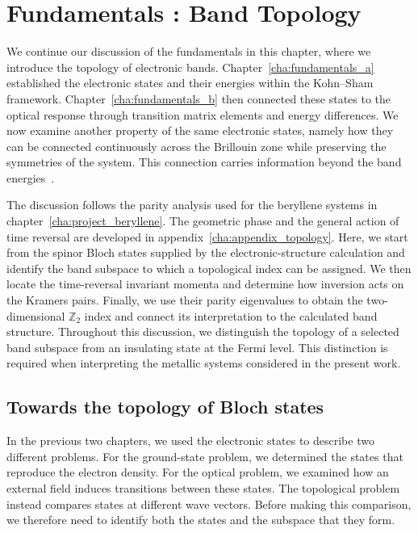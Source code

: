 \chapter{Fundamentals : Band Topology}
\label{cha:fundamentals_c}

We continue our discussion of the fundamentals in this chapter, where we introduce the topology of electronic bands.
Chapter~\ref{cha:fundamentals_a} established the electronic states and their energies within the Kohn--Sham framework.
Chapter~\ref{cha:fundamentals_b} then connected these states to the optical response through transition matrix elements and energy differences.
We now examine another property of the same electronic states, namely how they can be connected continuously across the Brillouin zone while preserving the symmetries of the system.
This connection carries information beyond the band energies~\cite{bansil2016colloquium}.

The discussion follows the parity analysis used for the beryllene systems in chapter~\ref{cha:project_beryllene}.
The geometric phase and the general action of time reversal are developed in appendix~\ref{cha:appendix_topology}.
Here, we start from the spinor Bloch states supplied by the electronic-structure calculation
and identify the band subspace to which a topological index can be assigned.
We then locate the time-reversal invariant momenta and determine how inversion acts on the Kramers pairs.
Finally, we use their parity eigenvalues to obtain the two-dimensional $\mathbb{Z}_2$ index and connect its interpretation to the calculated band structure.
Throughout this discussion, we distinguish the topology of a selected band subspace from an insulating state at the Fermi level.
This distinction is required when interpreting the metallic systems considered in the present work.

\newpage
\section{Towards the topology of Bloch states}
\label{sec:toward_band_topology}

In the previous two chapters, we used the electronic states to describe two different problems.
For the ground-state problem, we determined the states that reproduce the electron density.
For the optical problem, we examined how an external field induces transitions between these states.
The topological problem instead compares states at different wave vectors.
Before making this comparison, we therefore need to identify both the states and the subspace that they form.

